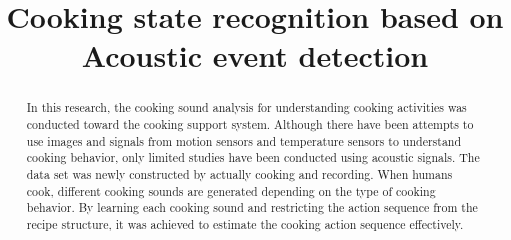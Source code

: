 \documentclass[sigchi]{acmart}
\begin{document}
\title{Cooking state recognition based on \\ Acoustic event detection}


%

%
\begin{abstract}
  In this research, the cooking sound analysis for understanding cooking activities was conducted toward the cooking support system.
  Although there have been attempts to use images and signals from motion sensors and temperature sensors to understand cooking behavior, only limited studies have been conducted using acoustic signals.
  The data set was newly constructed by actually cooking and recording.
  When humans cook, different cooking sounds are generated depending on the type of cooking behavior. By learning each cooking sound and restricting the action sequence from the recipe structure, it was achieved to estimate the cooking action sequence effectively.
\end{abstract}
\end{document}

